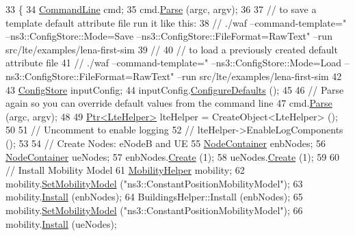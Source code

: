 \begin{DoxyCode}
33 \{       
34   \hyperlink{classns3_1_1CommandLine}{CommandLine} cmd;
35   cmd.\hyperlink{classns3_1_1CommandLine_a5c10b85b3207e5ecb48d907966923156}{Parse} (argc, argv);
36         
37   \textcolor{comment}{// to save a template default attribute file run it like this:}
38   \textcolor{comment}{// ./waf --command-template="%
       --ns3::ConfigStore::Mode=Save --ns3::ConfigStore::FileFormat=RawText" --run src/lte/examples/lena-first-sim}
39   \textcolor{comment}{//}
40   \textcolor{comment}{// to load a previously created default attribute file}
41   \textcolor{comment}{// ./waf --command-template="%
       --ns3::ConfigStore::Mode=Load --ns3::ConfigStore::FileFormat=RawText" --run src/lte/examples/lena-first-sim}
42 
43   \hyperlink{classns3_1_1ConfigStore}{ConfigStore} inputConfig;
44   inputConfig.\hyperlink{classns3_1_1ConfigStore_a0a6137574d7c847c3823af8b9d1bb886}{ConfigureDefaults} ();
45 
46   \textcolor{comment}{// Parse again so you can override default values from the command line}
47   cmd.\hyperlink{classns3_1_1CommandLine_a5c10b85b3207e5ecb48d907966923156}{Parse} (argc, argv);
48 
49   \hyperlink{classns3_1_1Ptr}{Ptr<LteHelper>} lteHelper = CreateObject<LteHelper> ();
50 
51   \textcolor{comment}{// Uncomment to enable logging}
52 \textcolor{comment}{//  lteHelper->EnableLogComponents ();}
53 
54   \textcolor{comment}{// Create Nodes: eNodeB and UE}
55   \hyperlink{classns3_1_1NodeContainer}{NodeContainer} enbNodes;
56   \hyperlink{classns3_1_1NodeContainer}{NodeContainer} ueNodes;
57   enbNodes.\hyperlink{classns3_1_1NodeContainer_a787f059e2813e8b951cc6914d11dfe69}{Create} (1);
58   ueNodes.\hyperlink{classns3_1_1NodeContainer_a787f059e2813e8b951cc6914d11dfe69}{Create} (1);
59 
60   \textcolor{comment}{// Install Mobility Model}
61   \hyperlink{classns3_1_1MobilityHelper}{MobilityHelper} mobility;
62   mobility.\hyperlink{classns3_1_1MobilityHelper_a030275011b6f40682e70534d30280aba}{SetMobilityModel} (\textcolor{stringliteral}{"ns3::ConstantPositionMobilityModel"});
63   mobility.\hyperlink{classns3_1_1MobilityHelper_a07737960ee95c0777109cf2994dd97ae}{Install} (enbNodes);
64   BuildingsHelper::Install (enbNodes);
65   mobility.\hyperlink{classns3_1_1MobilityHelper_a030275011b6f40682e70534d30280aba}{SetMobilityModel} (\textcolor{stringliteral}{"ns3::ConstantPositionMobilityModel"});
66   mobility.\hyperlink{classns3_1_1MobilityHelper_a07737960ee95c0777109cf2994dd97ae}{Install} (ueNodes);

\end{DoxyCode}
